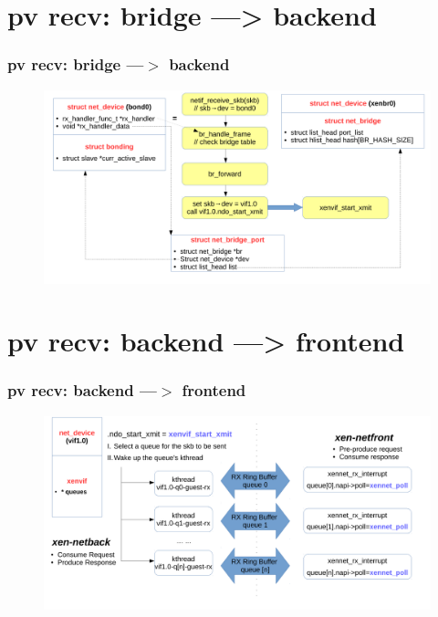 \documentclass[aspectratio=169]{beamer}
\begin{document}
\section{pv recv: bridge ---> backend}
\begin{frame}
\frametitle{pv recv: bridge ---$>$ backend}
\begin{figure}
\includegraphics[width=1.0\linewidth]{figures/bridge_to_vif.pdf}
\end{figure}
\end{frame}


\section{pv recv: backend ---> frontend}
\begin{frame}
\frametitle{pv recv: backend ---$>$ frontend}
\begin{figure}
\includegraphics[width=1.0\linewidth]{figures/vif_to_eth.pdf}
\end{figure}
\end{frame}

\end{document}
